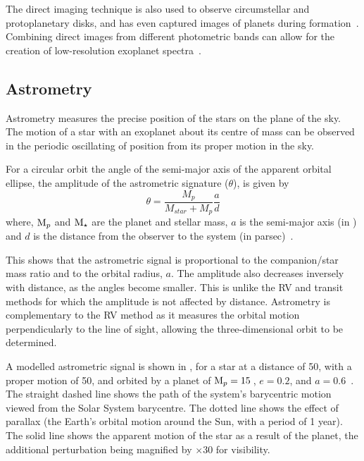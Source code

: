 The direct imaging technique is also used to observe circumstellar and protoplanetary disks, and has even captured images of planets during formation~\citep[e.g.][]{sallum_accreting_2015}.
Combining direct images from different photometric bands can allow for the creation of low-resolution exoplanet spectra~\citep[e.g.][]{kuzuhara_direct_2013, zurlo_new_2015}.


\subsection{Astrometry}

\label{sub:astrometry}
Astrometry measures the precise position of the stars on the plane of the sky.
The motion of a star with an exoplanet about its centre of mass can be observed in the periodic oscillating of position from its proper motion in the sky.

For a circular orbit the angle of the semi-major axis of the apparent orbital ellipse, the amplitude of the astrometric signature ($\theta$), is given by
\begin{equation}
\theta = \frac{M_{p}}{M_{star} + M_{p}} \frac{a}{d}
\end{equation}
where, $\textrm{M}_{p}$ and $\textrm{M}_{\star}$ are the planet and stellar mass, $a$ is the semi-major axis (in \AU) and $d$ is the distance from the observer to the system (in parsec)~\citep{perryman_exoplanet_2011}.

This shows that the astrometric signal is proportional to the companion/star mass ratio and to the orbital radius, $a$.
The amplitude also decreases inversely with distance, as the angles become smaller.
This is unlike the {RV} and transit methods for which the amplitude is not affected by distance.
Astrometry is complementary to the {RV} method as it measures the orbital motion perpendicularly to the line of sight, allowing the three-dimensional orbit to be determined.

A modelled astrometric signal is shown in , for a star at a distance of 50\pc, with a proper motion of 50\masperyr{}, and orbited by a planet of $\textrm{M}_{p} = 15$\,\Mjup{}, $e = 0.2$, and $a = 0.6$\AU~\citep{perryman_extrasolar_2000}.
The straight dashed line shows the path of the system's barycentric motion viewed from the Solar System barycentre.
The dotted line shows the effect of parallax (the Earth's orbital motion around the Sun, with a period of 1 year).
The solid line shows the apparent motion of the star as a result of the planet, the additional perturbation being magnified by $\times 30$ for visibility.

